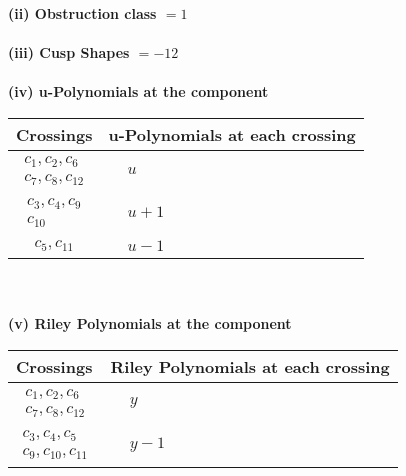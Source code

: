 \documentclass[1p]{elsarticle_modified}
\theoremstyle{definition}
\begin{document}
\flushleft \textbf{(ii) Obstruction class $= 1$}\\~\\
\flushleft \textbf{(iii) Cusp Shapes $= -12$}\\~\\
\newpage\renewcommand{\arraystretch}{1}
\flushleft \textbf{(iv) u-Polynomials at the component}\newline \\
\begin{tabular}{m{50pt}|m{274pt}}
Crossings & \hspace{64pt}u-Polynomials at each crossing \\
\hline $$\begin{aligned}c_{1},c_{2},c_{6}\\c_{7},c_{8},c_{12}\end{aligned}$$&$\begin{aligned}
&u
\end{aligned}$\\
\hline $$\begin{aligned}c_{3},c_{4},c_{9}\\c_{10}\end{aligned}$$&$\begin{aligned}
&u+1
\end{aligned}$\\
\hline $$\begin{aligned}c_{5},c_{11}\end{aligned}$$&$\begin{aligned}
&u-1
\end{aligned}$\\
\hline
\end{tabular}\\~\\
\newpage\renewcommand{\arraystretch}{1}
\flushleft \textbf{(v) Riley Polynomials at the component}\newline \\
\begin{tabular}{m{50pt}|m{274pt}}
Crossings & \hspace{64pt}Riley Polynomials at each crossing \\
\hline $$\begin{aligned}c_{1},c_{2},c_{6}\\c_{7},c_{8},c_{12}\end{aligned}$$&$\begin{aligned}
&y
\end{aligned}$\\
\hline $$\begin{aligned}c_{3},c_{4},c_{5}\\c_{9},c_{10},c_{11}\end{aligned}$$&$\begin{aligned}
&y-1
\end{aligned}$\\
\hline
\end{tabular}\\~\\
\end{document}

